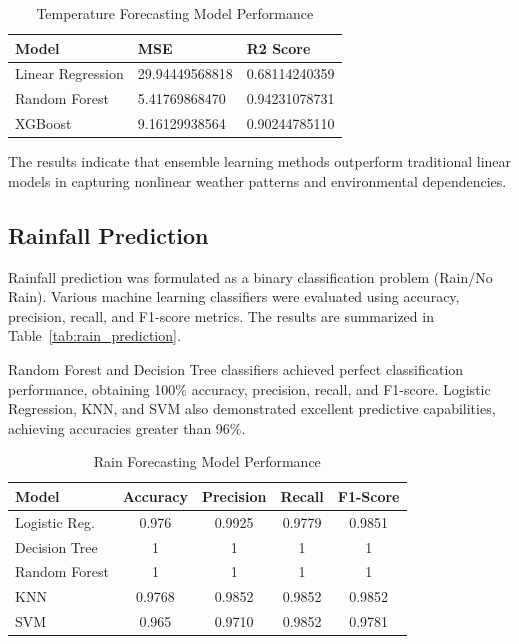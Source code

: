 \documentclass[conference]{IEEEtran}
\begin{document}
\begin{table}[ht]
\centering
\caption{Temperature Forecasting Model Performance}
\footnotesize
\begin{tabular}{|p{2.3cm}|p{2.8cm}|p{2.2cm}|}
\hline
\textbf{Model} & \textbf{MSE} & \textbf{R2 Score} \\
\hline
Linear Regression &
29.94449568818 &
0.68114240359 \\
\hline
Random Forest &
5.41769868470 &
0.94231078731 \\
\hline
XGBoost &
9.16129938564 &
0.90244785110 \\
\hline
\end{tabular}
\label{tab:temp_forecast}
\end{table}

The results indicate that ensemble learning methods outperform traditional linear models in capturing nonlinear weather patterns and environmental dependencies.

\subsection{Rainfall Prediction}

Rainfall prediction was formulated as a binary classification problem (Rain/No Rain). Various machine learning classifiers were evaluated using accuracy, precision, recall, and F1-score metrics. The results are summarized in Table~\ref{tab:rain_prediction}.

Random Forest and Decision Tree classifiers achieved perfect classification performance, obtaining 100\% accuracy, precision, recall, and F1-score. Logistic Regression, KNN, and SVM also demonstrated excellent predictive capabilities, achieving accuracies greater than 96\%.

\begin{table}[ht]
\centering
\caption{Rain Forecasting Model Performance}
\label{tab:rain_prediction}
\footnotesize
\begin{tabular}{|p{1.9cm}|c|c|c|c|}
\hline
\textbf{Model} &
\textbf{Accuracy} &
\textbf{Precision} &
\textbf{Recall} &
\textbf{F1-Score} \\
\hline

Logistic Reg. & 0.976 & 0.9925 & 0.9779 & 0.9851 \\
\hline
Decision Tree & 1 & 1 & 1 & 1 \\
\hline
Random Forest & 1 & 1 & 1 & 1 \\
\hline
KNN & 0.9768 & 0.9852 & 0.9852 & 0.9852 \\
\hline
SVM & 0.965 & 0.9710 & 0.9852 & 0.9781 \\
\hline
\end{tabular}
\label{tab:rain_forecast}
\end{table}
\end{document}
